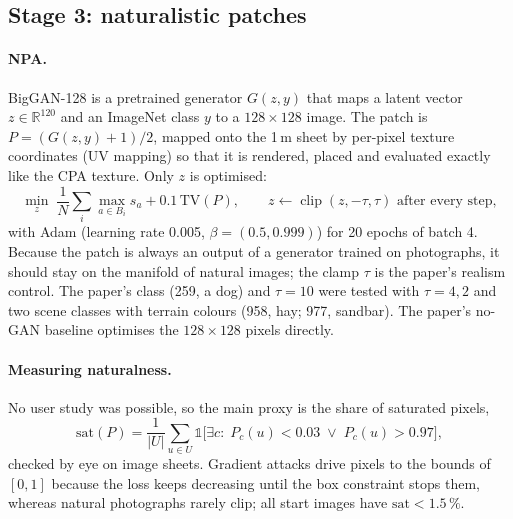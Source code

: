 \documentclass[11pt,a4paper]{article}
\begin{document}
\subsection{Stage 3: naturalistic patches}\label{sec:npa}
\paragraph{NPA.} BigGAN-128 \cite{brock2019} is a pretrained generator $G(z,y)$ that maps a latent vector $z\in\mathbb{R}^{120}$ and an ImageNet class $y$ to a $128\times128$ image. The patch is $P=(G(z,y)+1)/2$, mapped onto the 1\,m sheet by per-pixel texture coordinates (UV mapping) so that it is rendered, placed and evaluated exactly like the CPA texture. Only $z$ is optimised:
\begin{equation}
\min_z\;\frac{1}{N}\sum_i\max_{a\in B_i}s_a+0.1\,\mathrm{TV}(P),\qquad z\leftarrow\operatorname{clip}(z,-\tau,\tau)\text{ after every step},
\end{equation}
with Adam (learning rate 0.005, $\beta=(0.5,0.999)$) for 20 epochs of batch 4. Because the patch is always an output of a generator trained on photographs, it should stay on the manifold of natural images; the clamp $\tau$ is the paper's realism control. The paper's class (259, a dog) and $\tau=10$ were tested with $\tau=4,2$ and two scene classes with terrain colours (958, hay; 977, sandbar). The paper's no-GAN baseline optimises the $128\times128$ pixels directly.

\paragraph{Measuring naturalness.} No user study was possible, so the main proxy is the share of saturated pixels,
\begin{equation}
\mathrm{sat}(P)=\frac{1}{|U|}\sum_{u\in U}\mathbb{1}\big[\exists c:\;P_c(u)<0.03\;\lor\;P_c(u)>0.97\big],
\end{equation}
checked by eye on image sheets. Gradient attacks drive pixels to the bounds of $[0,1]$ because the loss keeps decreasing until the box constraint stops them, whereas natural photographs rarely clip; all start images have $\mathrm{sat}<1.5\,\%$.
\end{document}
